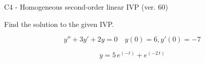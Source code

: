 \begin{exercise}
  \begin{exerciseTitle}C4 - Homogeneous second-order linear IVP (ver. 60)\end{exerciseTitle}
  \begin{exerciseStatement}
    
Find the solution to the given IVP.

    
\[y''+3y'+2y = 0 \hspace{1em} y(0) = 6 , y'(0) = -7\]

  \end{exerciseStatement}
  \begin{exerciseAnswer}
    
\[y= 5 \, e^{\left(-t\right)} + e^{\left(-2 \, t\right)}\]

  \end{exerciseAnswer}
\end{exercise}